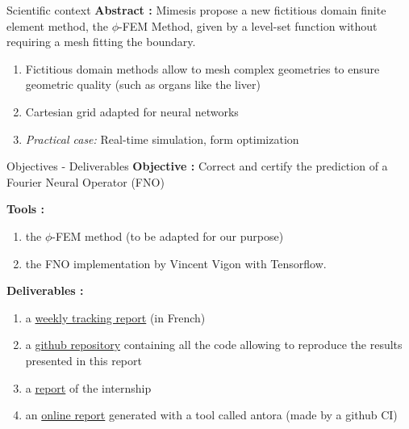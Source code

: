 \documentclass[compress,10pt,xcolor={table,dvipsnames},t]{beamer}
\begin{document}
	\begin{frame}{Scientific context}
		\textbf{Abstract :} Mimesis propose a new fictitious domain finite element method, the $\phi$-FEM Method, given by a level-set function without requiring a mesh fitting the boundary. 
		
		\begin{enumerate}[\ding{217}]
			\item Fictitious domain methods allow to mesh complex geometries to ensure geometric quality (such as organs like the liver)
			\item Cartesian grid adapted for neural networks
			\item \textit{Practical case:} Real-time simulation, form optimization
		\end{enumerate}
		
		\begin{center}
		\end{center}		
	\end{frame}

	\begin{frame}{Objectives - Deliverables}
		\textbf{Objective :} Correct and certify the prediction of a Fourier Neural Operator (FNO)
		
		\textbf{Tools :} 
		
		\begin{enumerate}[\ding{217}]
			\item the $\phi$-FEM method (to be adapted for our purpose) 
			\item the FNO implementation by Vincent Vigon with Tensorflow.
		\end{enumerate}
		
		\textbf{Deliverables :}

		\begin{enumerate}[\ding{217}]
			\item a \href{https://github.com/flecourtier/phifem_stage/blob/main/docs/suivi/suivi.pdf}{weekly tracking report} (in French)
			\item a \href{https://github.com/flecourtier/phifem_stage}{github repository} containing all the code allowing to reproduce the results presented in this report
			\item a \href{https://csmi.cemosis.fr/csmi-stages-2023/m2/_attachments/Lecourtier-Fr\%C3\%A9d\%C3\%A9rique.pdf}{report} of the internship
			\item an \href{https://flecourtier.github.io/phifem_stage/phifem_project/1.0.3/main_page.html}{online report} generated with a tool called antora (made by a github CI)
		\end{enumerate}
	\end{frame}
\end{document}
